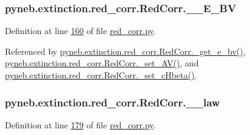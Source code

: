 \begin{DoxyVerb}
\hypertarget{classpyneb_1_1extinction_1_1red__corr_1_1_red_corr_ad223ec4556fb47fc607488c318e58b13}{}
\subsubsection[{\+\_\+\+\_\+\+E\+\_\+\+B\+V}]{\setlength{\rightskip}{0pt plus 5cm}pyneb.\+extinction.\+red\+\_\+corr.\+Red\+Corr.\+\_\+\+\_\+\+E\+\_\+\+B\+V\hspace{0.3cm}{\ttfamily [private]}}\label{classpyneb_1_1extinction_1_1red__corr_1_1_red_corr_ad223ec4556fb47fc607488c318e58b13}


Definition at line \hyperlink{red__corr_8py_source_l00160}{160} of file \hyperlink{red__corr_8py_source}{red\+\_\+corr.\+py}.



Referenced by \hyperlink{red__corr_8py_source_l00146}{pyneb.\+extinction.\+red\+\_\+corr.\+Red\+Corr.\+\_\+get\+\_\+e\+\_\+bv()}, \hyperlink{red__corr_8py_source_l00169}{pyneb.\+extinction.\+red\+\_\+corr.\+Red\+Corr.\+\_\+set\+\_\+\+A\+V()}, and \hyperlink{red__corr_8py_source_l00164}{pyneb.\+extinction.\+red\+\_\+corr.\+Red\+Corr.\+\_\+set\+\_\+c\+Hbeta()}.

\hypertarget{classpyneb_1_1extinction_1_1red__corr_1_1_red_corr_a08b0e3499e1b8a289d7b2c7e805e6129}{}
\subsubsection[{\+\_\+\+\_\+law}]{\setlength{\rightskip}{0pt plus 5cm}pyneb.\+extinction.\+red\+\_\+corr.\+Red\+Corr.\+\_\+\+\_\+law\hspace{0.3cm}{\ttfamily [private]}}\label{classpyneb_1_1extinction_1_1red__corr_1_1_red_corr_a08b0e3499e1b8a289d7b2c7e805e6129}


Definition at line \hyperlink{red__corr_8py_source_l00179}{179} of file \hyperlink{red__corr_8py_source}{red\+\_\+corr.\+py}.




\end{DoxyVerb}
